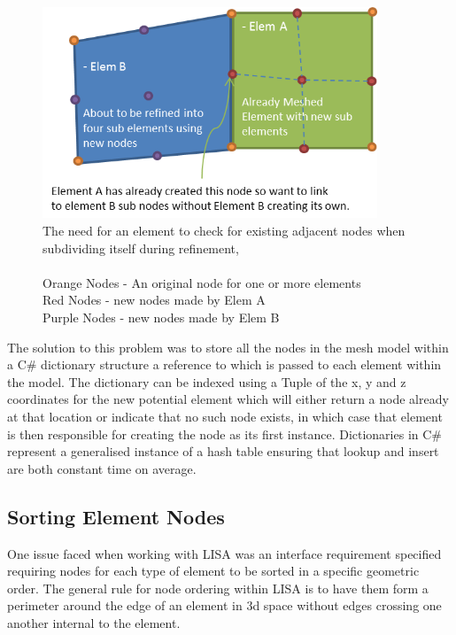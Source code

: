 \begin{figure}[!h]
  \centerline{\includegraphics[width=100mm , scale=1]{../Graphics/nodeLinking.png}}
  \caption{The need for an element to check for existing adjacent nodes when subdividing itself during refinement,\\ \\
  	Orange Nodes - An original node for one or more elements \\
	Red Nodes - new nodes made by Elem A \\
	Purple Nodes - new nodes made by Elem B \\
  }
  \label{fig:h-refinementImp}
\end{figure}


\noindent
The solution to this problem was to store all the nodes in the mesh model within a C\# dictionary structure a reference to which is passed to each element within the model. The dictionary can be indexed using a Tuple of the x, y and z coordinates for the new potential element which will either return a node already at that location or indicate that no such node exists, in which case that element is then responsible for creating the node as its first instance. Dictionaries in C\# represent a generalised instance of a hash table ensuring that lookup and insert are both constant time on average.

\subsection{Sorting Element Nodes}
One issue faced when working with LISA was an interface requirement specified requiring nodes for each type of element to be sorted in a specific geometric order. The general rule for node ordering within LISA is to have them form a perimeter around the edge of an element in 3d space without edges crossing one another internal to the element. 

